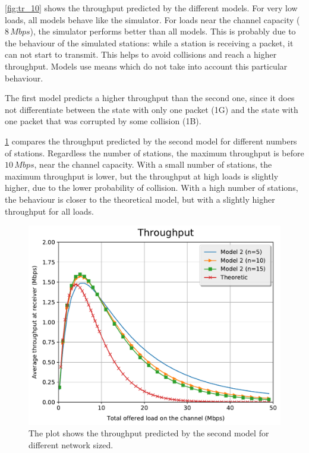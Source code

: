 \cref{fig:tr_10} shows the throughput predicted by the different models.
For very low loads, all models behave like the simulator.
For loads near the channel capacity ($8\, Mbps$), the simulator performs better than all models.
This is probably due to the behaviour of the simulated stations:
while a station is receiving a packet, it can not start to transmit.
This helps to avoid collisions and reach a higher throughput.
Models use means which do not take into account this particular behaviour.

The first model predicts a higher throughput than the second one, since it does not differentiate between the state with only one packet (1G) and the state with one packet that was corrupted by some collision (1B).

\cref{fig:tr_1g1b} compares the throughput predicted by the second model for different numbers of stations.
Regardless the number of stations, the maximum throughput is before $10\,Mbps$, near the channel capacity.
With a small number of stations, the maximum throughput is lower, but the throughput at high loads is slightly higher, due to the lower probability of collision.
With a high number of stations, the behaviour is closer to the theoretical model, but with a slightly higher throughput for all loads.

\begin{figure}[t]
	\centering
	\includegraphics[width=.99\columnwidth]{figures/tr_1g1b}
	\caption{The plot shows the throughput predicted by the second model for different network sized.}
	\label{fig:tr_1g1b}
\end{figure}

